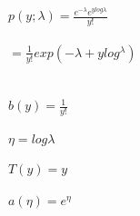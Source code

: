 \newcommand\tab[1][1cm]{\hspace*{#1}}
\begin{answer}
	\\ \\
	\tab[3cm]$p(y ; \lambda) = \frac{e^{-\lambda}e^{ylog\lambda}}{y!}$ \\ \\
	\tab[4.cm]$=\frac{1}{y!}exp(-\lambda + ylog^\lambda)$ \\ \\ \\ 
	\tab[3cm]$b(y) = \frac{1}{y!}$ \\ \\
	\tab[3cm]$\eta = log\lambda$ \\ \\
	\tab[3cm]$T(y) = y $ \\ \\
	\tab[3cm]$a(\eta) = e^\eta$ \\ \\ 
\end{answer}
